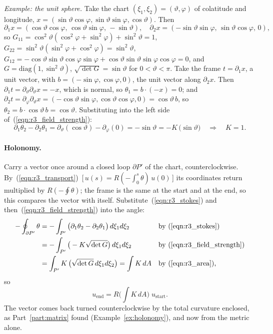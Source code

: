 \emph{Example: the unit sphere.} Take the chart $(\xi_1, \xi_2) = (\vartheta, \varphi)$ of colatitude and longitude, $x = (\sin\vartheta\cos\varphi, \sin\vartheta\sin\varphi, \cos\vartheta)$. Then
\begin{equation*}
\partial_1 x = (\cos\vartheta\cos\varphi,\, \cos\vartheta\sin\varphi,\, -\sin\vartheta), \quad \partial_2 x = (-\sin\vartheta\sin\varphi,\, \sin\vartheta\cos\varphi,\, 0) ,
\end{equation*}
so $G_{11} = \cos^2\vartheta(\cos^2\varphi + \sin^2\varphi) + \sin^2\vartheta = 1$, $G_{22} = \sin^2\vartheta(\sin^2\varphi + \cos^2\varphi) = \sin^2\vartheta$, $G_{12} = -\cos\vartheta\sin\vartheta\cos\varphi\sin\varphi + \cos\vartheta\sin\vartheta\sin\varphi\cos\varphi = 0$, and $G = \mathrm{diag}(1, \sin^2\vartheta)$, $\sqrt{\det G} = \sin\vartheta$ for $0 < \vartheta < \pi$. Take the frame $t = \partial_1 x$, a unit vector, with $b = (-\sin\varphi, \cos\varphi, 0)$, the unit vector along $\partial_2x$. Then $\partial_1t = \partial_\vartheta\partial_\vartheta x = -x$, which is normal, so $\theta_1 = b\cdot(-x) = 0$; and $\partial_2t = \partial_\varphi\partial_\vartheta x = (-\cos\vartheta\sin\varphi, \cos\vartheta\cos\varphi, 0) = \cos\vartheta\, b$, so $\theta_2 = b\cdot\cos\vartheta\, b = \cos\vartheta$. Substituting into the left side of~(\ref{eqn:r3_field_strength}):
\begin{equation*}
\partial_1\theta_2 - \partial_2\theta_1 = \partial_\vartheta(\cos\vartheta) - \partial_\varphi(0) = -\sin\vartheta = -K\,\big(\sin\vartheta\big) \quad\Longrightarrow\quad K = 1 .
\end{equation*}

\paragraph{Holonomy.} Carry a vector once around a closed loop $\partial P'$ of the chart, counterclockwise. By~(\ref{eqn:r3_transport})~[\,$u(s) = R(-\int_0^s\theta)\,u(0)$\,] its coordinates return multiplied by $R(-\oint\theta)$; the frame is the same at the start and at the end, so this compares the vector with itself. Substitute~(\ref{eqn:r3_stokes}) and then~(\ref{eqn:r3_field_strength}) into the angle:
\begin{align*}
-\oint_{\partial P'}\theta &= -\int_{P'} \big(\partial_1\theta_2 - \partial_2\theta_1\big)\, d\xi_1 d\xi_2 && \text{by (\ref{eqn:r3_stokes})} \\
&= -\int_{P'} \big(-K\sqrt{\det G}\big)\, d\xi_1 d\xi_2 && \text{by (\ref{eqn:r3_field_strength})} \\
&= \int_{P'} K\, \big(\sqrt{\det G}\, d\xi_1 d\xi_2\big) = \int K\, dA && \text{by (\ref{eqn:r3_area}),}
\end{align*}
so
\begin{equation}
\label{eqn:r3_holonomy}
u_{\text{end}} = R\Big(\int K\, dA\Big)\; u_{\text{start}} .
\end{equation}
The vector comes back turned counterclockwise by the total curvature enclosed, as Part~\ref{part:matrix} found (Example~\ref{ex:holonomy}), and now from the metric alone.

